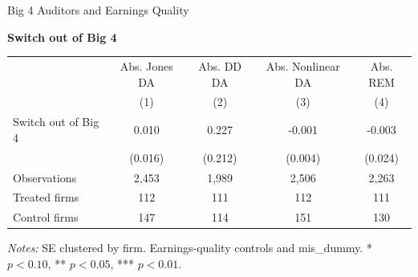 \documentclass[10pt]{article}
\begin{document}
\fontsize{10}{12}\selectfont
\setlength{\tabcolsep}{3pt}\renewcommand{\arraystretch}{1.15}
\begin{center}\large Big 4 Auditors and Earnings Quality\end{center}
\medskip\textbf{Switch out of Big 4}\par\smallskip
\begin{tabular*}{\textwidth}{@{\extracolsep{\fill}}lcccc@{}}
\toprule
 & Abs. Jones DA & Abs. DD DA & Abs. Nonlinear DA & Abs. REM \\
 & (1) & (2) & (3) & (4) \\
\midrule
Switch out of Big 4 & 0.010 & 0.227 & -0.001 & -0.003 \\
 & (0.016) & (0.212) & (0.004) & (0.024) \\
Observations & 2,453 & 1,989 & 2,506 & 2,263 \\
Treated firms & 112 & 111 & 112 & 111 \\
Control firms & 147 & 114 & 151 & 130 \\
\bottomrule\end{tabular*}\par
\medskip\fontsize{9}{11}\selectfont\textit{Notes:} SE clustered by firm. Earnings-quality controls and mis\_dummy. * $p<0.10$, ** $p<0.05$, *** $p<0.01$.
\end{document}
